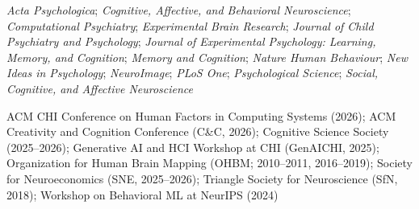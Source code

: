 
\par
\begin{cvparagraph}
\textit{Acta Psychologica}; \textit{Cognitive, Affective, and Behavioral Neuroscience}; \textit{Computational Psychiatry}; \textit{Experimental Brain Research}; \textit{Journal of Child Psychiatry and Psychology}; \textit{Journal of Experimental Psychology: Learning, Memory, and Cognition}; \textit{Memory and Cognition}; \textit{Nature Human Behaviour}; \textit{New Ideas in Psychology}; \textit{NeuroImage}; \textit{PLoS One}; \textit{Psychological Science}; \textit{Social, Cognitive, and Affective Neuroscience}
\end{cvparagraph}

\par
\begin{cvparagraph}
ACM CHI Conference on Human Factors in Computing Systems (2026); ACM Creativity and Cognition Conference (C\&C, 2026); Cognitive Science Society (2025--2026); Generative AI and HCI Workshop at CHI (GenAICHI, 2025); Organization for Human Brain Mapping (OHBM; 2010--2011, 2016--2019); Society for Neuroeconomics (SNE, 2025--2026); Triangle Society for Neuroscience (SfN, 2018); Workshop on Behavioral ML at NeurIPS (2024)
\end{cvparagraph}